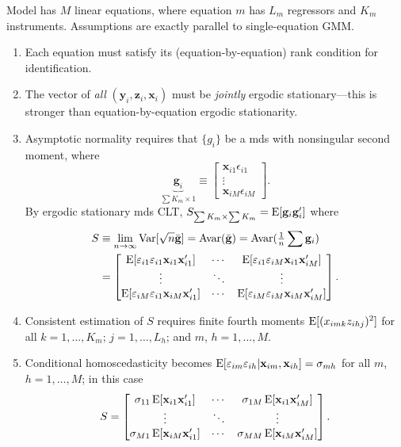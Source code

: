 \documentclass[8pt,letterpaper, landscape]{extarticle} %
\newcommand{\mx}{\ensuremath{\mathbf{x}}}
\begin{document}
\begin{multicols}{3}
\begin{description}
Model has $ M $ linear equations, where equation $ m $ has $ L_m $ regressors and $ K_m $ instruments. Assumptions are exactly parallel to single-equation GMM.
\begin{enumerate}
\item Each equation must satisfy its (equation-by-equation) rank condition for identification.
\item The vector of \textit{all} $ (\mathbf{y}_i , \mathbf{z}_i , \mx_i ) $ must be \textit{jointly} ergodic stationary---this is stronger than equation-by-equation ergodic stationarity.
\item Asymptotic normality requires that $ \{ g_i \} $ be a mds with nonsingular second moment, where
\[ \underbrace{\mathbf{g}_i}_{\sum K_m \times 1} \equiv \begin{bmatrix}
\mx_{i1} \epsilon_{i1} \\
\vdots \\
\mx_{iM} \epsilon_{iM}
\end{bmatrix}. \]
By ergodic stationary mds CLT, $ S_{\sum K_m \times \sum K_m} = \operatorname{E} [\mathbf{g}_i \mathbf{g}_{i}'] $ where
\begin{align*}
S &\equiv \lim_{n \to \infty} \Var [\sqrt{n} \bar{\mathbf{g}}] = \Avar (\bar{\mathbf{g}}) = \Avar (\tfrac{1}{n} \sum \mathbf{g}_i ) \\
&= \begin{bmatrix}
\E [\epsilon_{i1} \epsilon_{i1} \mx_{i1} \mx_{i1}'] & \cdots & \E [\epsilon_{i1} \epsilon_{iM} \mx_{i1} \mx_{iM}']  \\
\vdots & \ddots & \vdots \\
\E [\epsilon_{iM} \epsilon_{i1} \mx_{iM} \mx_{i1}'] & \cdots & \E [\epsilon_{iM} \epsilon_{iM} \mx_{iM} \mx_{iM}']
\end{bmatrix}.
\end{align*}
\item Consistent estimation of $ S $ requires finite fourth moments $ \operatorname{E} [(x_{imk} z_{ihj})^{2}] $ for all $ k = 1, \dotsc , K_m $; $ j = 1 , \dotsc , L_h $; and $ m $, $ h = 1, \dotsc , M $.
\item Conditional homoscedasticity becomes $ \E [\epsilon_{im} \epsilon_{ih} | \mx_{im}, \mx_{ih}] = \sigma_{mh} $ for all $ m $, $ h = 1, \dotsc , M $; in this case
$$
S = \begin{bmatrix}
\sigma_{11} \E [\mx_{i1} \mx_{i1}'] & \cdots & \sigma_{1M} \E [\mx_{i1} \mx_{iM}']  \\
\vdots & \ddots & \vdots \\
\sigma_{M1} \E [\mx_{iM} \mx_{i1}'] & \cdots & \sigma_{MM} \E [\mx_{iM} \mx_{iM}']
\end{bmatrix}.
$$
\end{enumerate}


\end{description}
\end{multicols}
\end{document}
